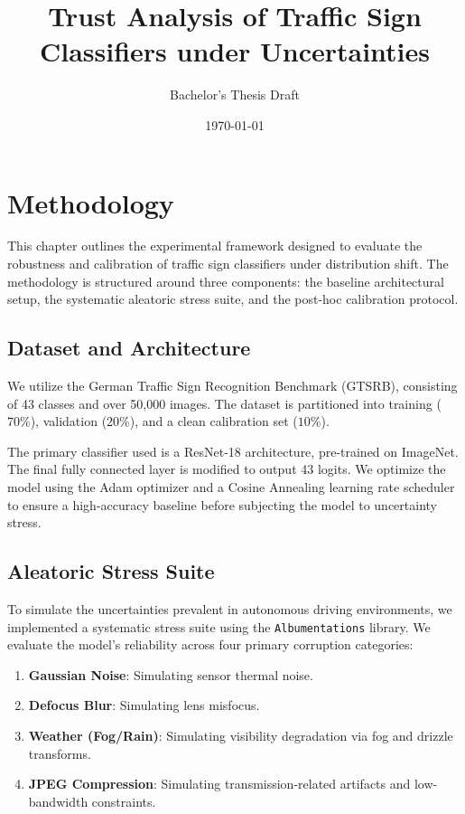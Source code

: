 \documentclass[12pt,a4paper]{report}
\title{Trust Analysis of Traffic Sign Classifiers under Uncertainties}
\author{Bachelor's Thesis Draft}
\date{\today}
\begin{document}
\maketitle
\tableofcontents

\chapter{Methodology}
\label{ch:methodology}

This chapter outlines the experimental framework designed to evaluate the robustness and calibration of traffic sign classifiers under distribution shift. The methodology is structured around three components: the baseline architectural setup, the systematic aleatoric stress suite, and the post-hoc calibration protocol.

\section{Dataset and Architecture}
\label{sec:dataset_architecture}

We utilize the German Traffic Sign Recognition Benchmark (GTSRB), consisting of 43 classes and over 50,000 images. The dataset is partitioned into training ($70\%$), validation ($20\%$), and a clean calibration set ($10\%$).

The primary classifier used is a ResNet-18 architecture, pre-trained on ImageNet. The final fully connected layer is modified to output 43 logits. We optimize the model using the Adam optimizer and a Cosine Annealing learning rate scheduler to ensure a high-accuracy baseline before subjecting the model to uncertainty stress.

\section{Aleatoric Stress Suite}
\label{sec:stress_suite}

To simulate the uncertainties prevalent in autonomous driving environments, we implemented a systematic stress suite using the \texttt{Albumentations} library. We evaluate the model's reliability across four primary corruption categories:
\begin{enumerate}
    \item \textbf{Gaussian Noise}: Simulating sensor thermal noise.
    \item \textbf{Defocus Blur}: Simulating lens misfocus.
    \item \textbf{Weather (Fog/Rain)}: Simulating visibility degradation via fog and drizzle transforms.
    \item \textbf{JPEG Compression}: Simulating transmission-related artifacts and low-bandwidth constraints.
\end{enumerate}
\end{document}
